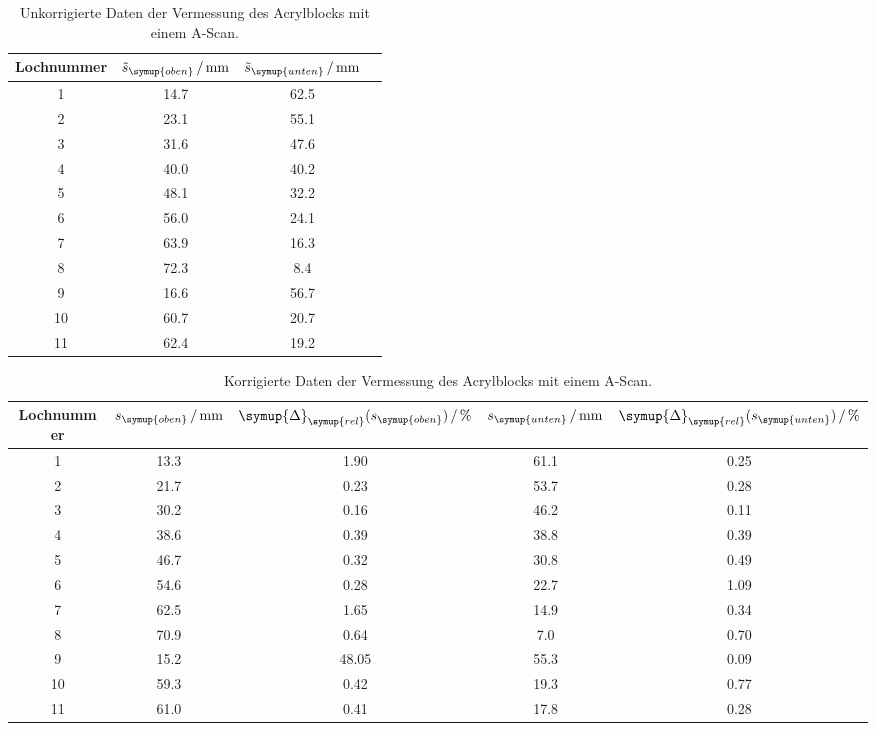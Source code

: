   \begin{table}[H]
    \centering
    \caption{Unkorrigierte Daten der Vermessung des Acrylblocks mit einem A-Scan.}
    \label{tab:a-scan}
    \begin{tabular}{S[table-format=2.0] S[table-format=2.1] S[table-format=2.1] S[table-format=2.1]}
        \toprule
         {Lochnummer} & {$\tilde{s}_{\symup{oben}}\,/\,\unit{\milli\metre}$} & {$\tilde{s}_{\symup{unten}}\,/\,\unit{\milli\metre}$} \\
        	& 14.7 & 62.5 \\
         2	& 23.1 & 55.1 \\
         3	& 31.6 & 47.6 \\
         4	& 40.0 & 40.2 \\
         5	& 48.1 & 32.2 \\
         6	& 56.0 & 24.1 \\
         7	& 63.9 & 16.3 \\
         8	& 72.3 &  8.4 \\
         9	& 16.6 & 56.7 \\
         10	& 60.7 & 20.7 \\
         11	& 62.4 & 19.2 \\
        \bottomrule 
    \end{tabular}
  \end{table}

  \begin{table}[H]
    \centering
    \caption{Korrigierte Daten der Vermessung des Acrylblocks mit einem A-Scan.}
    \label{tab:a-scan_korr}
    \begin{tabular}{S[table-format=2.0] S[table-format=2.1] S[table-format=2.2] S[table-format=2.1] S[table-format=1.2]}
        \toprule
         {Lochnummer} & {$s_{\symup{oben}}\,/\,\unit{\milli\metre}$} & {$\symup{\Delta}_{\symup{rel}}(s_{\symup{oben}})\,/\,\unit{\percent}$} & %
         {$s_{\symup{unten}}\,/\,\unit{\milli\metre}$} & {$\symup{\Delta}_{\symup{rel}}(s_{\symup{unten}})\,/\,\unit{\percent}$} \\
        	& 13.3 &  1.90 & 61.1 & 0.25 \\
         2	& 21.7 &  0.23 & 53.7 & 0.28 \\
         3	& 30.2 &  0.16 & 46.2 & 0.11 \\
         4	& 38.6 &  0.39 & 38.8 & 0.39 \\
         5	& 46.7 &  0.32 & 30.8 & 0.49 \\
         6	& 54.6 &  0.28 & 22.7 & 1.09 \\
         7	& 62.5 &  1.65 & 14.9 & 0.34 \\
         8	& 70.9 &  0.64 &  7.0 & 0.70 \\
         9	& 15.2 & 48.05 & 55.3 & 0.09 \\
         10	& 59.3 &  0.42 & 19.3 & 0.77 \\
         11	& 61.0 &  0.41 & 17.8 & 0.28 \\
        \bottomrule 
    \end{tabular}
  \end{table}

